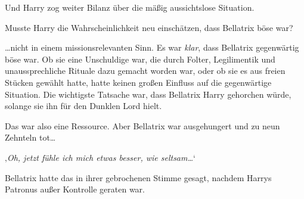 Und Harry zog weiter Bilanz über die mäßig aussichtslose Situation.

Musste Harry die Wahrscheinlichkeit neu einschätzen, dass Bellatrix böse war?

…nicht in einem missionsrelevanten Sinn. Es war \emph{klar}, dass Bellatrix gegenwärtig böse war. Ob sie eine Unschuldige war, die durch Folter, Legilimentik und unaussprechliche Rituale dazu gemacht worden war, oder ob sie es aus freien Stücken gewählt hatte, hatte keinen großen Einfluss auf die gegenwärtige Situation. Die wichtigste Tatsache war, dass Bellatrix Harry gehorchen würde, solange sie ihn für den Dunklen Lord hielt.

Das war also eine Ressource. Aber Bellatrix war ausgehungert und zu neun Zehnteln tot…

‚\emph{Oh, jetzt fühle ich mich etwas besser, wie seltsam…}‘

Bellatrix hatte das in ihrer gebrochenen Stimme gesagt, nachdem Harrys Patronus außer Kontrolle geraten war.


